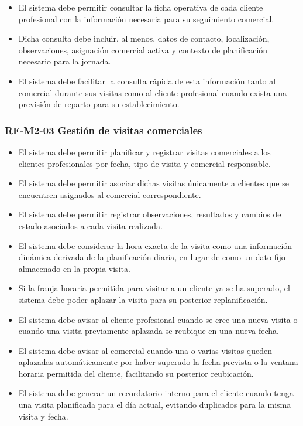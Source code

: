 \begin{itemize}
    \item El sistema debe permitir consultar la ficha operativa de cada cliente profesional con la información necesaria para su seguimiento comercial.
    \item Dicha consulta debe incluir, al menos, datos de contacto, localización, observaciones, asignación comercial activa y contexto de planificación necesario para la jornada.
    \item El sistema debe facilitar la consulta rápida de esta información tanto al comercial durante sus visitas como al cliente profesional cuando exista una previsión de reparto para su establecimiento.
\end{itemize}

\vspace{-0.75em}
\subsubsection{RF-M2-03 Gestión de visitas comerciales}
\vspace{-1em}

\begin{itemize}
    \item El sistema debe permitir planificar y registrar visitas comerciales a los clientes profesionales por fecha, tipo de visita y comercial responsable.
    \item El sistema debe permitir asociar dichas visitas únicamente a clientes que se encuentren asignados al comercial correspondiente.
    \item El sistema debe permitir registrar observaciones, resultados y cambios de estado asociados a cada visita realizada.
    \item El sistema debe considerar la hora exacta de la visita como una información dinámica derivada de la planificación diaria, en lugar de como un dato fijo almacenado en la propia visita.
    \item Si la franja horaria permitida para visitar a un cliente ya se ha superado, el sistema debe poder aplazar la visita para su posterior replanificación.
    \item El sistema debe avisar al cliente profesional cuando se cree una nueva visita o cuando una visita previamente aplazada se reubique en una nueva fecha.
    \item El sistema debe avisar al comercial cuando una o varias visitas queden aplazadas automáticamente por haber superado la fecha prevista o la ventana horaria permitida del cliente, facilitando su posterior reubicación.
    \item El sistema debe generar un recordatorio interno para el cliente cuando tenga una visita planificada para el día actual, evitando duplicados para la misma visita y fecha.
\end{itemize}

